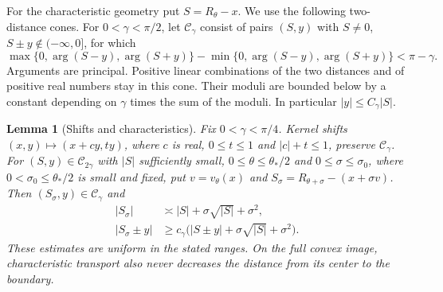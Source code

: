 \documentclass[a4paper,10pt]{article}
\numberwithin{equation}{section}
\theoremstyle{paperplain}
\newtheorem{lmm}[thm]{Lemma}
\theoremstyle{paperremark}
\theoremstyle{paperplain}
\begin{document}
For the characteristic geometry put $S=R_\theta-x$. We use the
following two-distance cones. For $0<\gamma<\pi/2$, let
$\mathcal C_\gamma$ consist of pairs $(S,y)$ with $S\ne0$,
$S\pm y\notin(-\infty,0]$, for which
\begin{equation}\label{eq:b:cone}
 \max\{0,\arg(S-y),\arg(S+y)\}
 -\min\{0,\arg(S-y),\arg(S+y)\}<\pi-\gamma.
\end{equation}
Arguments are principal. Positive linear combinations of the two
distances and of positive real numbers stay in this cone. Their
moduli are bounded below by a constant depending on $\gamma$ times
the sum of the moduli. In particular $|y|\leq C_\gamma|S|$.

\begin{lmm}[Shifts and characteristics]\label{lmm:b:cone-transport}
Fix $0<\gamma<\pi/4$. Kernel shifts $(x,y)\mapsto(x+c y,t y)$, where $c$ is real,
$0\leq t\leq1$ and $|c|+t\leq1$, preserve
$\mathcal C_\gamma$. For $(S,y)\in\mathcal C_{2\gamma}$ with
$|S|$ sufficiently small, $0\leq\theta\leq\theta_*/2$ and
$0\leq\sigma\leq\sigma_0$, where $0<\sigma_0\leq\theta_*/2$ is small and fixed,
put $v=v_\theta(x)$ and
$S_\sigma=R_{\theta+\sigma}-(x+\sigma v)$. Then
$(S_\sigma,y)\in\mathcal C_\gamma$ and
\begin{equation}\label{eq:b:transport-distances}
 \begin{aligned}
 |S_\sigma|&\asymp |S|+\sigma\sqrt{|S|}+\sigma^2,\\
 |S_\sigma\pm y|&\geq c_\gamma
       \bigl(|S\pm y|+\sigma\sqrt{|S|}+\sigma^2\bigr).
 \end{aligned}
\end{equation}
These estimates are uniform in the stated ranges. On the full
convex image, characteristic transport also never decreases the
distance from its center to the boundary.
\end{lmm}
\end{document}
